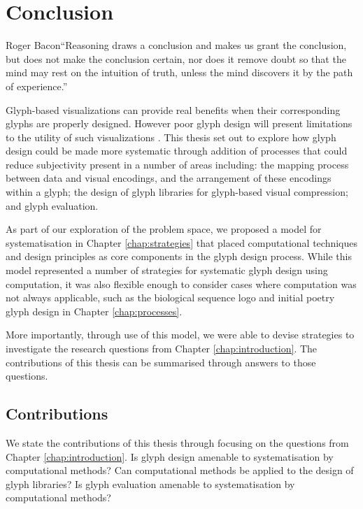 \chapter{Conclusion}
\label{chap:conclusion}

\begin{chapquote}{Roger Bacon}{``Reasoning draws a conclusion and makes us grant the conclusion, but does not make the conclusion certain, nor does it remove doubt so that the mind may rest on the intuition of truth, unless the mind discovers it by the path of experience.''}
\end{chapquote}

Glyph-based visualizations can provide real benefits when their corresponding glyphs are properly designed.
However poor glyph design will present limitations to the utility of such visualizations \cite{morris2000experimental, ward02}.
This thesis set out to explore how glyph design could be made more systematic through addition of processes that could reduce subjectivity present in a number of areas including:
the mapping process between data and visual encodings, and the arrangement of these encodings within a glyph; 
the design of glyph libraries for glyph-based visual compression; and
glyph evaluation.

As part of our exploration of the problem space, we proposed a model for systematisation in Chapter \ref{chap:strategies} that placed computational techniques and design principles as core components in the glyph design process.
While this model represented a number of strategies for systematic glyph design using computation, it was also flexible enough to consider cases where computation was not always applicable, such as the biological sequence logo and initial poetry glyph design in Chapter \ref{chap:processes}.

More importantly, through use of this model, we were able to devise strategies to investigate the research questions from Chapter \ref{chap:introduction}.
The contributions of this thesis can be summarised through answers to those questions.

\section{Contributions}
We state the contributions of this thesis through focusing on the questions from Chapter \ref{chap:introduction}.
Is glyph design amenable to systematisation by computational methods?
Can computational methods be applied to the design of glyph libraries?
Is glyph evaluation amenable to systematisation by computational methods?

